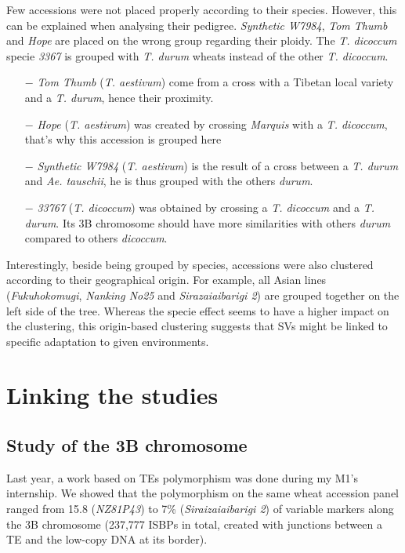 \documentclass[a4paper, 12pt]{article}
\begin{document}
\begin{onehalfspace}
Few accessions were not placed properly according to their species. However, this can be explained when analysing their pedigree. \textit{Synthetic W7984}, \textit{Tom Thumb} and \textit{Hope} are placed on the wrong group regarding their ploidy. The \textit{T. dicoccum} specie \textit{3367} is grouped with \textit{T. durum} wheats instead of the other \textit{T. dicoccum}. 

\begin{itemize}
\item[$-$] \textit{Tom Thumb} (\textit{T. aestivum}) come from a cross with a Tibetan local variety and a \textit{T. durum}, hence their proximity.
\item[$-$] \textit{Hope} (\textit{T. aestivum}) was created by crossing \textit{Marquis} with a \textit{T. dicoccum}, that's why this accession is grouped here
\item[$-$] \textit{Synthetic W7984} (\textit{T. aestivum}) is the result of a cross between a \textit{T. durum} and \textit{Ae. tauschii}, he is thus grouped with the others \textit{durum}.
\item[$-$] \textit{33767} (\textit{T. dicoccum}) was obtained by crossing a \textit{T. dicoccum} and a \textit{T. durum}. Its 3B chromosome should have more similarities with others \textit{durum} compared to others \textit{dicoccum}.
\end{itemize}

Interestingly, beside being grouped by species, accessions were also clustered according to their geographical origin. For example, all Asian lines (\textit{Fukuhokomugi}, \textit{Nanking No25} and \textit{Sirazaiaibarigi 2}) are grouped together on the left side of the tree. Whereas the specie effect seems to have a higher impact on the clustering, this origin-based clustering suggests that SVs might be linked to specific adaptation to given environments.

    \section{Linking the studies}

        \subsection{Study of the 3B chromosome}

Last year, a work based on TEs polymorphism was done during my M1's internship. We showed that the polymorphism on the same wheat accession panel ranged from 15.8 (\textit{NZ81P43}) to 7\% (\textit{Siraizaiaibarigi 2}) of variable markers along the 3B chromosome (237,777 ISBPs in total, created with junctions between a TE and the low-copy DNA at its border).


\end{onehalfspace}
\end{document}
